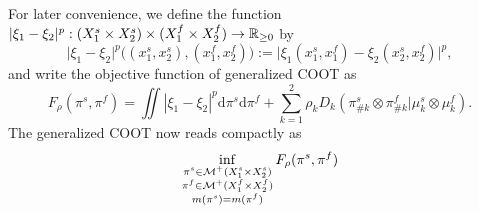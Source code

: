 
For later convenience, we define the function
$\vert \xi_1 - \xi_2 \vert^p: (X_1^s \times X_2^s) \times (X_1^f \times X_2^f) \to \mathbb R_{\geq 0}$ by
\begin{equation}
    \vert \xi_1 - \xi_2 \vert^p \big((x_1^s, x_2^s), (x_1^f, x_2^f)\big) :=
    \vert \xi_1(x_1^s, x_1^f) - \xi_2(x_2^s, x_2^f) \vert^p,
\end{equation}
and write the objective function of generalized COOT as
\begin{equation}
    F_{\rho}(\pi^s, \pi^f) = \iint |\xi_1 - \xi_2|^p \mathrm d\pi^s \mathrm d \pi^f
    + \sum_{k=1}^2\rho_k D_k(\pi^s_{\#k} \otimes \pi^f_{\#k} \vert \mu^s_k \otimes \mu^f_k).
\end{equation}
The generalized COOT now reads compactly as
\begin{equation} \label{eq:ucoot_copy}
  \inf_{\substack{\pi^s \in \mathcal M^+(X_1^s \times X_2^s) \\
  \pi^f \in \mathcal M^+(X_1^f \times X_2^f) \\ m(\pi^s) = m(\pi^f)}} F_{\rho}(\pi^s, \pi^f)
\end{equation}

